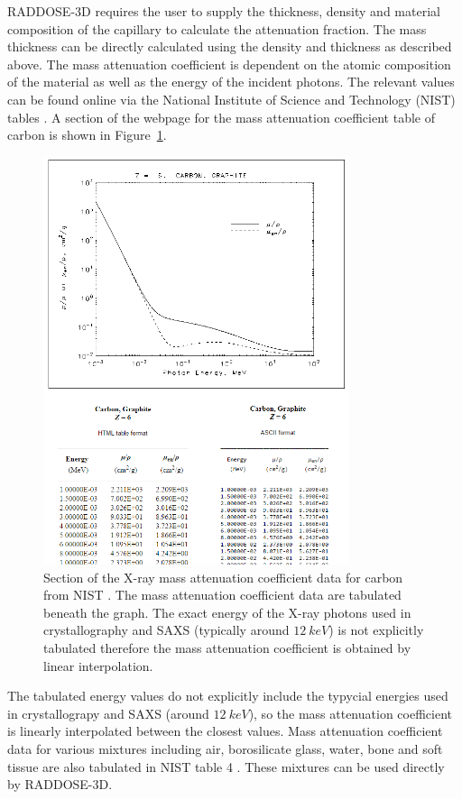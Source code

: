RADDOSE-3D requires the user to supply the thickness, density and material composition of the capillary to calculate the attenuation fraction.
The mass thickness can be directly calculated using the density and thickness as described above.
The mass attenuation coefficient is dependent on the atomic composition of the material as well as the energy of the incident photons.
The relevant values can be found online via the National Institute of Science and Technology (NIST) tables \cite{nisttable3,nisttable4}.
A section of the webpage for the mass attenuation coefficient table of carbon is shown in Figure~\ref{fig:NIST table for carbon}.
\begin{figure}
    \centering
    \includegraphics[width=0.8\textwidth]{figures/saxs/nist_table_carbon.png}
    \caption{Section of the X-ray mass attenuation coefficient data for carbon from NIST \cite{nisttable3}. The mass attenuation coefficient data are tabulated beneath the graph. The exact energy of the X-ray photons used in crystallography and SAXS (typically around $12\ keV$) is not explicitly tabulated therefore the mass attenuation coefficient is obtained by linear interpolation.}
    \label{fig:NIST table for carbon}
\end{figure}
The tabulated energy values do not explicitly include the typycial energies used in crystallograpy and SAXS (around $12\ keV$), so the mass attenuation coefficient is linearly interpolated between the closest values.
Mass attenuation coefficient data for various mixtures including air, borosilicate glass, water, bone and soft tissue are also tabulated in NIST table 4 \cite{nisttable4}.
These mixtures can be used directly by RADDOSE-3D.

